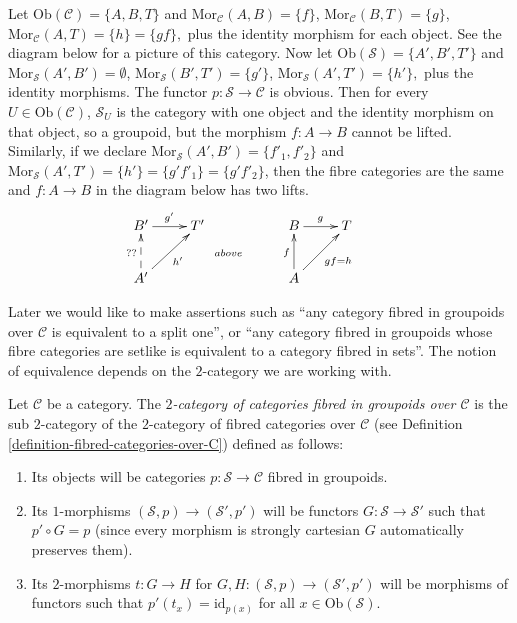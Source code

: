 \begin{example}
\label{example-not-fibred-in-groupoids-but-fibre-cats-are}
Let $\text{Ob}(\mathcal{C}) = \{A, B, T\}$ and
$\text{Mor}_\mathcal{C}(A, B) = \{f\}$, $\text{Mor}_\mathcal{C}(B, T) = \{g\}$,
$\text{Mor}_\mathcal{C}(A, T) = \{h\} = \{gf\}, $ plus the identity morphism
for each object. See the diagram below for a picture of this category. Now let
$\text{Ob}(\mathcal{S}) = \{A', B', T'\}$ and
$\text{Mor}_\mathcal{S}(A', B') = \emptyset$,
$\text{Mor}_\mathcal{S}(B', T') = \{g'\}$,
$\text{Mor}_\mathcal{S}(A', T') = \{h'\}, $ plus the identity morphisms. The
functor $p : \mathcal{S} \to \mathcal{C}$ is obvious. Then for every
$U \in \text{Ob}(\mathcal{C})$, $\mathcal{S}_U$ is the category with one
object and the identity morphism on that object, so a groupoid, but the
morphism $f: A \to B$ cannot be lifted. Similarly, if we declare
$\text{Mor}_\mathcal{S}(A', B') = \{f'_1, f'_2\}$ and
$ \text{Mor}_\mathcal{S}(A', T') = \{h'\} = \{g'f'_1 \} = \{g'f'_2\}$, then
the fibre categories are the same and $f: A \to B$ in the diagram below has
two lifts.
$$
\xymatrix{
B' \ar[r]^{g'} & T' &  & B \ar[r]^g & T & \\
A' \ar@{-->}[u]^{??} \ar[ru]_{h'} & & \ar@{}[u]^{above} &
A \ar[u]^f \ar[ru]_{gf = h} & \\
}
$$
\end{example}

\noindent
Later we would like to make assertions such as ``any category fibred in
groupoids over $\mathcal{C}$ is equivalent to a split one'', or
``any category fibred in groupoids whose fibre categories are setlike
is equivalent to a category fibred in sets''. The notion of equivalence
depends on the $2$-category we are working with.

\begin{definition}
\label{definition-categories-fibred-in-groupoids-over-C}
Let $\mathcal{C}$ be a category.
The {\it $2$-category of categories fibred in groupoids over $\mathcal{C}$}
is the sub $2$-category of the $2$-category of fibred categories
over $\mathcal{C}$ (see Definition \ref{definition-fibred-categories-over-C})
defined as follows:
\begin{enumerate}
\item Its objects will be categories
$p : \mathcal{S} \to \mathcal{C}$ fibred in groupoids.
\item Its $1$-morphisms $(\mathcal{S}, p) \to (\mathcal{S}', p')$
will be functors $G : \mathcal{S} \to \mathcal{S}'$ such that
$p' \circ G = p$ (since every morphism is strongly cartesian
$G$ automatically preserves them).
\item Its $2$-morphisms $t : G \to H$ for
$G, H : (\mathcal{S}, p) \to (\mathcal{S}', p')$
will be morphisms of functors
such that $p'(t_x) = \text{id}_{p(x)}$
for all $x \in \text{Ob}(\mathcal{S})$.
\end{enumerate}
\end{definition}

